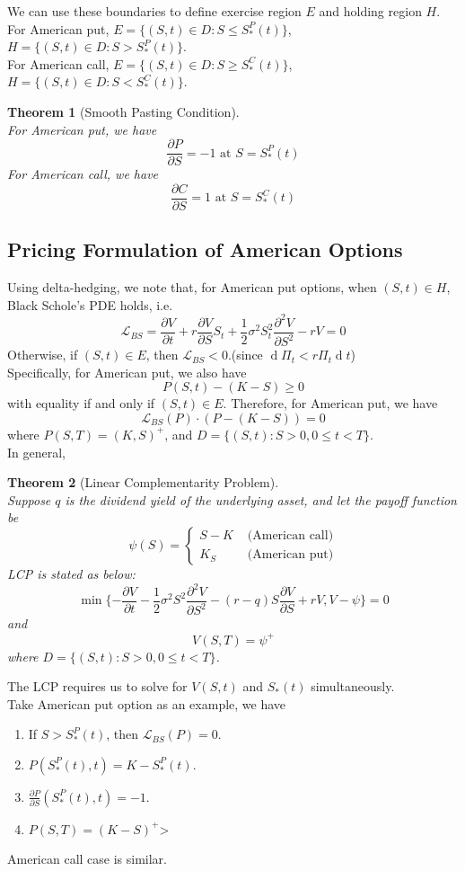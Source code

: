 \documentclass[12pt]{article}
\newtheorem{theorem}{Theorem}[section]
\theoremstyle{definition}
\DeclareMathOperator{\diff}{d}
\begin{document}
We can use these boundaries to define exercise region $E$ and holding region $H$.\\
For American put, $E=\{(S,t)\in D: S\leq S_\ast^P(t)\}$, $H=\{(S,t)\in D: S>S_\ast^P(t)\}$.\\
For American call, $E=\{(S,t)\in D: S\geq S_\ast^C(t)\}$, $H=\{(S,t)\in D: S<S_\ast^C(t)\}$.
\begin{theorem}[Smooth Pasting Condition]
\hfill\\\normalfont For American put, we have
\[
\frac{\partial P}{\partial S}=-1\text{ at }S=S^P_\ast(t)
\]
For American call, we have
\[
\frac{\partial C}{\partial S}=1\text{ at }S=S^C_\ast(t)
\]
\end{theorem}
\subsection{Pricing Formulation of American Options}
Using delta-hedging, we note that, for American put options, when $(S,t)\in H$, Black Schole's PDE holds, i.e.
\[
\mathcal{L}_{BS}=\frac{\partial V}{\partial t}+r\frac{\partial V}{\partial S}S_t +\frac{1}{2}\sigma^2S_t^2\frac{\partial^2 V}{\partial S^2}-rV=0
\]
Otherwise, if $(S,t)\in E$, then $\mathcal{L}_{BS}<0$.(since $\diff\Pi_t<r\Pi_t\diff t$)\\
Specifically, for American put, we also have
\[
P(S,t)-(K-S)\geq 0
\]
with equality if and only if $(S,t)\in E$. Therefore, for American put, we have
\[
\mathcal{L}_{BS}(P)\cdot (P-(K-S))=0
\]
where $P(S,T)=(K,S)^{+}$, and $D=\{(S,t): S>0, 0\leq t<T\}$.\\
In general, 
\begin{theorem}[Linear Complementarity Problem]
\hfill\\\normalfont Suppose $q$ is the dividend yield of the underlying asset, and let the payoff function be
\[
\psi(S)=\begin{cases}
S-K & \text{ (American call)}\\
K_S & \text{ (American put)}
\end{cases}
\]
LCP is stated as below:
\[
\min\{-\frac{\partial V}{\partial t}-\frac{1}{2}\sigma^2S^2\frac{\partial^2V}{\partial S^2}-(r-q)S\frac{\partial V}{\partial S}+rV, V-\psi\}=0
\]
and 
\[
V(S,T)=\psi^{+}
\]
where $D=\{(S,t):S>0, 0\leq t<T\}$.
\end{theorem}
The LCP requires us to solve for $V(S,t)$ and $S_{\ast}(t)$ simultaneously.\\
Take American put option as an example, we have
\begin{enumerate}
  \item If $S>S^{P}_{\ast}(t)$, then $\mathcal{L}_{BS}(P)=0$.
  \item $P(S_{\ast}^P(t), t)=K-S_{\ast}^P(t)$.
  \item $\frac{\partial P}{\partial S}(S_{\ast}^P(t), t)=-1$.
  \item $P(S,T)=(K-S)^{+}$>
\end{enumerate}
American call case is similar.
\end{document}
